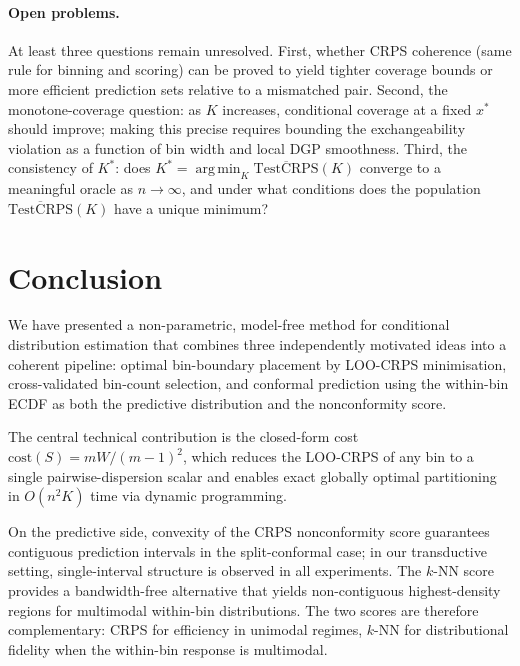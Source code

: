 \documentclass[11pt]{article}
\begin{document}
\paragraph{Open problems.}
At least three questions remain unresolved.
First, whether CRPS coherence (same rule for binning and scoring) can be proved to
yield tighter coverage bounds or more efficient prediction sets relative to a
mismatched pair.
Second, the monotone-coverage question: as $K$ increases, conditional coverage at
a fixed $x^*$ should improve; making this precise requires bounding the
exchangeability violation as a function of bin width and local DGP smoothness.
Third, the consistency of $K^*$: does
$K^*=\operatorname*{arg\,min}_{K}\overline{\mathrm{TestCRPS}}(K)$
converge to a meaningful oracle as $n\to\infty$, and under what conditions does
the population $\overline{\mathrm{TestCRPS}}(K)$ have a unique minimum?

\section{Conclusion}
\label{sec:conclusion}

We have presented a non-parametric, model-free method for conditional distribution
estimation that combines three independently motivated ideas into a coherent pipeline: optimal
bin-boundary placement by LOO-CRPS minimisation, cross-validated bin-count selection,
and conformal prediction using the within-bin ECDF as both the predictive distribution
and the nonconformity score.

The central technical contribution is the closed-form cost
$\mathrm{cost}(S) = mW/(m-1)^2$, which reduces the LOO-CRPS of any bin to a single
pairwise-dispersion scalar and enables exact globally optimal partitioning in
$O(n^2 K)$ time via dynamic programming.

On the predictive side, convexity of the CRPS nonconformity score guarantees
contiguous prediction intervals in the split-conformal case; in our transductive
setting, single-interval structure is observed in all experiments.
The $k$-NN score provides a bandwidth-free alternative that yields
non-contiguous highest-density regions for multimodal within-bin distributions.
The two scores are therefore complementary: CRPS for efficiency in unimodal regimes,
$k$-NN for distributional fidelity when the within-bin response is multimodal.
\end{document}
